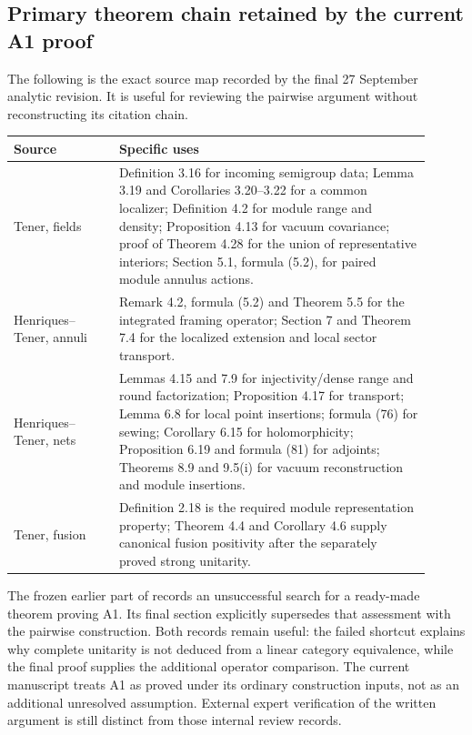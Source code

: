 \subsection{Primary theorem chain retained by the current A1 proof}

The following is the exact source map recorded by the final
27 September analytic revision. It is useful for reviewing the
pairwise argument without reconstructing its citation chain.

\begin{longtable}{@{}p{0.23\linewidth}p{0.68\linewidth}@{}}
\toprule
Source&Specific uses\\
\midrule\endhead
Tener, fields \cite{TenFields}&Definition 3.16 for incoming
semigroup data; Lemma 3.19 and Corollaries 3.20--3.22 for a common
localizer; Definition 4.2 for module range and density; Proposition
4.13 for vacuum covariance; proof of Theorem 4.28 for the union of
representative interiors; Section 5.1, formula (5.2), for paired
module annulus actions.\\
Henriques--Tener, annuli \cite{HTAnn}&Remark 4.2, formula (5.2)
and Theorem 5.5 for the integrated framing operator; Section 7
and Theorem 7.4 for the localized extension and local sector
transport.\\
Henriques--Tener, nets \cite{HTNet}&Lemmas 4.15 and 7.9 for
injectivity/dense range and round factorization; Proposition 4.17
for transport; Lemma 6.8 for local point insertions; formula (76)
for sewing; Corollary 6.15 for holomorphicity; Proposition 6.19 and
formula (81) for adjoints; Theorems 8.9 and 9.5(i) for vacuum
reconstruction and module insertions.\\
Tener, fusion \cite{TenFusion}&Definition 2.18 is the required
module representation property; Theorem 4.4 and Corollary 4.6
supply canonical fusion positivity after the separately proved
strong unitarity.\\
\bottomrule
\end{longtable}

The frozen earlier part of
 records an
unsuccessful search for a ready-made theorem proving A1. Its final
section explicitly supersedes that assessment with the pairwise
construction. Both records remain useful: the failed shortcut
explains why complete unitarity is not deduced from a linear
category equivalence, while the final proof supplies the additional
operator comparison. The current manuscript treats A1 as proved
under its ordinary construction inputs, not as an additional
unresolved assumption. External expert verification of the written
argument is still distinct from those internal review records.

